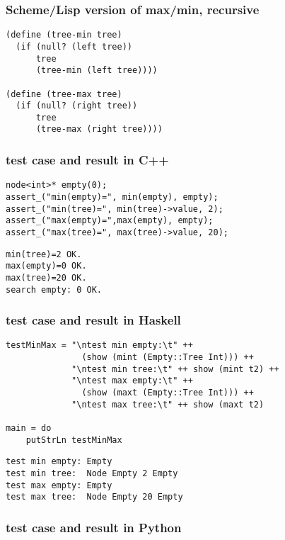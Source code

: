 \documentclass{article}
\begin{document}
\subsubsection*{Scheme/Lisp version of max/min, recursive}
\lstset{language=lisp}
\begin{lstlisting}
(define (tree-min tree)
  (if (null? (left tree))
      tree
      (tree-min (left tree))))

(define (tree-max tree)
  (if (null? (right tree))
      tree
      (tree-max (right tree))))
\end{lstlisting}

\subsubsection*{test case and result in C++}
\lstset{language=c++}
\begin{lstlisting}
node<int>* empty(0);
assert_("min(empty)=", min(empty), empty);
assert_("min(tree)=", min(tree)->value, 2);
assert_("max(empty)=",max(empty), empty);
assert_("max(tree)=", max(tree)->value, 20);
\end{lstlisting}

\begin{verbatim}
min(tree)=2 OK.
max(empty)=0 OK.
max(tree)=20 OK.
search empty: 0 OK.
\end{verbatim}

\subsubsection*{test case and result in Haskell}

\lstset{language=Haskell}
\begin{lstlisting}
testMinMax = "\ntest min empty:\t" ++ 
               (show (mint (Empty::Tree Int))) ++
             "\ntest min tree:\t" ++ show (mint t2) ++ 
             "\ntest max empty:\t" ++ 
               (show (maxt (Empty::Tree Int))) ++
             "\ntest max tree:\t" ++ show (maxt t2)

main = do
    putStrLn testMinMax
\end{lstlisting}

\begin{verbatim}
test min empty: Empty
test min tree:  Node Empty 2 Empty
test max empty: Empty
test max tree:  Node Empty 20 Empty
\end{verbatim}

\subsubsection*{test case and result in Python}
\end{document}
